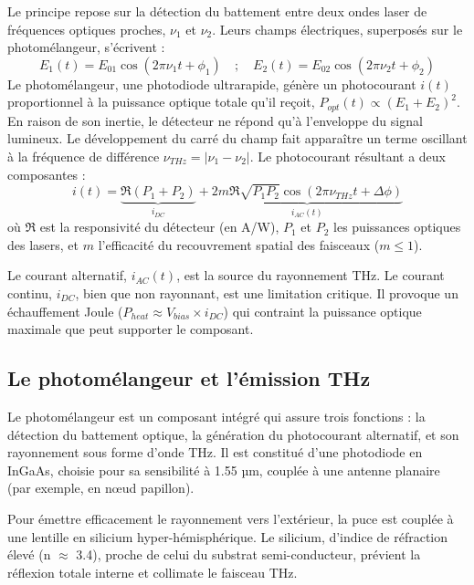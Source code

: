 Le principe repose sur la détection du battement entre deux ondes laser de fréquences optiques proches, $\nu_1$ et $\nu_2$. Leurs champs électriques, superposés sur le photomélangeur, s'écrivent :
\begin{equation}
E_1(t) = E_{01} \cos(2\pi\nu_1 t + \phi_1) \quad ; \quad E_2(t) = E_{02} \cos(2\pi\nu_2 t + \phi_2)
\end{equation}
Le photomélangeur, une photodiode ultrarapide, génère un photocourant $i(t)$ proportionnel à la puissance optique totale qu'il reçoit, $P_{opt}(t) \propto (E_1 + E_2)^2$. En raison de son inertie, le détecteur ne répond qu'à l'enveloppe du signal lumineux. Le développement du carré du champ fait apparaître un terme oscillant à la fréquence de différence $\nu_{THz} = |\nu_1 - \nu_2|$. Le photocourant résultant a deux composantes :
\begin{equation}
i(t) = \underbrace{\Re (P_1 + P_2)}_{i_{DC}} + \underbrace{2m\Re\sqrt{P_1 P_2} \cos(2\pi\nu_{THz}t + \Delta\phi)}_{i_{AC}(t)}
\end{equation}
où $\Re$ est la responsivité du détecteur (en A/W), $P_1$ et $P_2$ les puissances optiques des lasers, et $m$ l'efficacité du recouvrement spatial des faisceaux ($m \le 1$).

Le courant alternatif, $i_{AC}(t)$, est la source du rayonnement THz. Le courant continu, $i_{DC}$, bien que non rayonnant, est une limitation critique. Il provoque un échauffement Joule ($P_{heat} \approx V_{bias} \times i_{DC}$) qui contraint la puissance optique maximale que peut supporter le composant.

\subsection {Le photomélangeur et l'émission THz}

Le photomélangeur est un composant intégré qui assure trois fonctions : la détection du battement optique, la génération du photocourant alternatif, et son rayonnement sous forme d'onde THz. Il est constitué d'une photodiode en InGaAs, choisie pour sa sensibilité à 1.55 µm, couplée à une antenne planaire (par exemple, en nœud papillon).

Pour émettre efficacement le rayonnement vers l'extérieur, la puce est couplée à une lentille en silicium hyper-hémisphérique. Le silicium, d'indice de réfraction élevé (n $\approx$ 3.4), proche de celui du substrat semi-conducteur, prévient la réflexion totale interne et collimate le faisceau THz.

